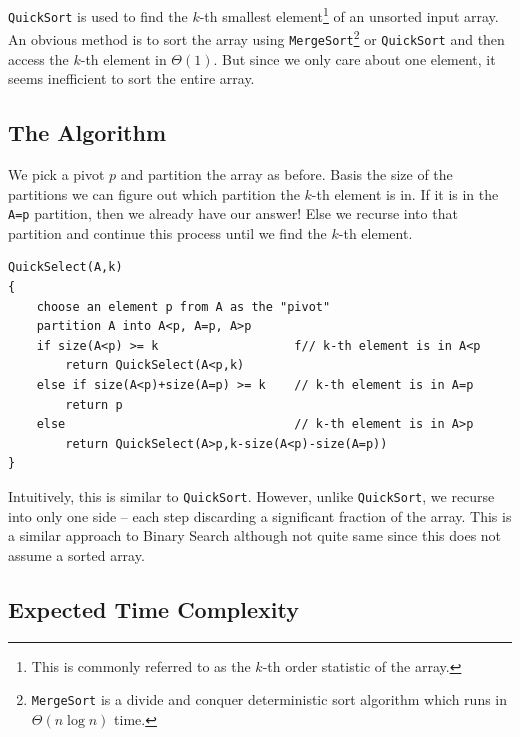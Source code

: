 \texttt{QuickSort} is used to find the \(k\)-th smallest element\footnote{This is commonly 
referred to as the \(k\)-th order statistic of the array.} of an unsorted input array. An obvious method is 
to sort the array using \texttt{MergeSort}\footnote{\texttt{MergeSort} is a divide and conquer 
deterministic sort algorithm which runs in $\Theta(n\log n)$ time.} or \texttt{QuickSort} and then 
access the \(k\)-th element in $\Theta(1)$. But since we only care about one element, it 
seems inefficient to sort the entire array.\\

\subsection{The Algorithm}

We pick a pivot \(p\) and partition the array as before.
Basis the size of the partitions we can figure out which partition the \(k\)-th element is in.
If it is in the \texttt{A=p} partition, then we already have our answer!
Else we recurse into that partition and continue this process until we find the \(k\)-th element.

\begin{center}
\begin{minipage}{0.9\linewidth}
\begin{framed}
\begin{Verbatim}
QuickSelect(A,k)
{
    choose an element p from A as the "pivot"
    partition A into A<p, A=p, A>p
    if size(A<p) >= k                   f// k-th element is in A<p
        return QuickSelect(A<p,k)
    else if size(A<p)+size(A=p) >= k    // k-th element is in A=p
        return p
    else                                // k-th element is in A>p
        return QuickSelect(A>p,k-size(A<p)-size(A=p))
}
\end{Verbatim}
\vspace{-4mm}
\end{framed}
\end{minipage}
\end{center}

Intuitively, this is similar to \texttt{QuickSort}. However, unlike \texttt{QuickSort}, 
we recurse into only one side -- each step discarding a significant fraction of the array. This is a 
similar approach to Binary Search although not quite same since this does not assume a sorted array. 

\subsection{Expected Time Complexity}


